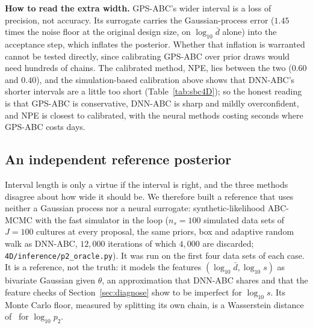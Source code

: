 \documentclass[sn-basic,iicol,pdflatex]{sn-jnl}
\begin{document}
\begin{table}[t]
\centering
\caption{Wasserstein distance of each posterior from the GPS-ABC posterior for the same data set, per parameter ($\log_{10}$ units for
$p_1,p_2,\delta$; mean $\pm$ s.e.\ over five data sets).}
\label{tab:fid4D}
\small

\end{table}

\noindent\textbf{How to read the extra width.} GPS-ABC's wider interval is a loss of precision, not accuracy. Its surrogate carries the Gaussian-process error
($1.45$ times the noise floor at the original design size, on $\log_{10}\bar d$ alone) into the acceptance step, which inflates the posterior. Whether that inflation is warranted cannot be tested
directly, since calibrating GPS-ABC over prior draws would need hundreds of chains. The calibrated method, NPE, lies between the two ($0.60$ and $0.40$), and the simulation-based
calibration above shows that DNN-ABC's shorter intervals are a little too short (Table~\ref{tab:sbc4D}); so the honest reading is that GPS-ABC is conservative, DNN-ABC is sharp and mildly
overconfident, and NPE is closest to calibrated, with the neural methods costing seconds where GPS-ABC costs days.


\subsection{An independent reference posterior}
\label{sec:oracle}

Interval length is only a virtue if the interval is right, and the three methods disagree about how wide it should be. We therefore
built a reference that uses neither a Gaussian process nor a neural surrogate: synthetic-likelihood ABC-MCMC
\citep{wood2010,price2018} with the fast simulator in the loop ($n_s=100$ simulated data sets of $J=100$ cultures at every proposal,
the same priors, box and adaptive random walk as DNN-ABC, $12{,}000$ iterations of which $4{,}000$ are discarded;
\texttt{4D/inference/p2\_oracle.py}). It was run on the first four data sets of each case. It is a reference, not the truth: it models
the features $(\log_{10}\bar d,\log_{10}s)$ as bivariate Gaussian given $\theta$, an approximation that DNN-ABC shares and that the feature
checks of Section~\ref{sec:diagnose} show to be imperfect for $\log_{10}s$. Its Monte Carlo floor, measured by splitting its own chain,
is a Wasserstein distance of \ptwoMcFloorWOneLogPTwo\ for $\log_{10}p_2$.
\end{document}
